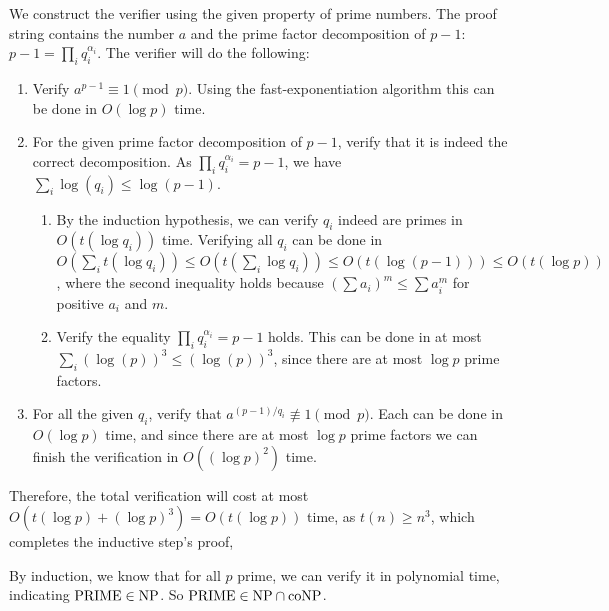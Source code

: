\documentclass{homework}
\begin{document}
\begin{solution}
  We construct the verifier using the given property of prime numbers. The proof string contains the number $a$ and the prime factor decomposition of $p-1$: $p-1 = \prod_i q_i^{\alpha_i}$. The verifier will do the following:
  \begin{enumerate}
    \item Verify $a^{p-1} \equiv 1 \pmod{p}$. Using the fast-exponentiation algorithm this can be done in $O(\log p)$ time. 
    \item For the given prime factor decomposition of $p-1$, verify that it is indeed the correct decomposition. As $\prod_i q_i^{\alpha_i}=p-1$, we have $\sum_i \log(q_i)\le\log(p-1)$. \begin{enumerate}
      \item By the induction hypothesis, we can verify $q_i$ indeed are primes in $O(t(\log q_i))$ time. Verifying all $q_i$ can be done in $O(\sum_i t(\log q_i))\le O(t(\sum_i\log q_i))\le O(t(\log(p-1)))\le O(t(\log p))$, where the second inequality holds because $(\sum a_i)^m \le \sum a_i^m$ for positive $a_i$ and $m$.
      \item Verify the equality $\prod_i q_i^{\alpha_i}=p-1$ holds. This can be done in at most $\sum_i (\log(p))^{3}\le (\log(p))^{3}$, since there are at most $\log p$ prime factors.
    \end{enumerate}
    \item For all the given $q_i$, verify that $a^{(p-1)/q_i} \not\equiv 1 \pmod{p}$. Each can be done in $O(\log p)$ time, and since there are at most $\log p$ prime factors we can finish the verification in $O((\log p)^2)$ time.
  \end{enumerate}
  Therefore, the total verification will cost at most $O(t(\log p) + (\log p)^{3}) = O(t(\log p))$ time, as $t(n)\ge n^3$, which completes the inductive step's proof,

  By induction, we know that for all $p$ prime, we can verify it in polynomial time, indicating $\mathrm{PRIME}\in\textup{NP}$. So $\mathrm{PRIME}\in\textup{NP}\cap\textup{coNP}$.
  
\end{solution}
\end{document}
